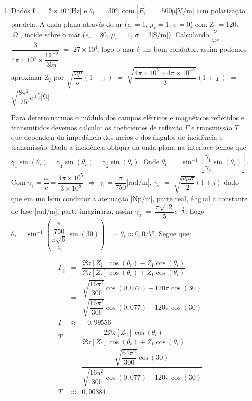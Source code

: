 \begin{enumerate}[1.]
\newpage

\item Dados f $=$ $2 \times 10^{5}$[\si{\hertz}] e $\theta_{i}$ $=$ $30$\si{\degree}, com $|\vec{E}_{i}|$ $=$ $500\si{\micro}$[\si{\volt/\meter}] com polarização paralela. A onda plana através do ar ($\epsilon_{r} = 1$, $\mu_{r} = 1$, $\sigma = 0$) com Z$_{1} = 120\pi$[\si{\ohm}], incide sobre o mar ($\epsilon_{r} = 80$, $\mu_{r} = 1$, $\sigma = 3$[\si{\siemens/\meter}]). Calculando $\dfrac{\sigma}{\omega\epsilon}$ $=$ $\dfrac{3}{4\pi \times 10^{5} \times \dfrac{10^{-9}}{36\pi}}$ $=$ $27 \times 10^{4}$, logo o mar é um bom condutor, assim podemos aproximar Z$_{2}$ por $\sqrt{\dfrac{\omega\mu}{\sigma}}(1 + \jmath)$ $=$ $\sqrt{\dfrac{4\pi \times 10^{5} \times 4\pi \times 10^{-7}}{3}}(1 + \jmath)$ $=$ $\sqrt{\dfrac{8\pi^{2}}{75}}e^{\jmath\frac{\pi}{4}}$[\si{\ohm}] %

Para determinarmos o módulo dos campos elétricos e magnéticos refletidos e transmitidos devemos calcular os coeficientes de reflexão $\Gamma$ e transmissão $T$ que dependem da impedância dos meios e dos ângulos de incidência e transmissão. Dada a incidência oblíqua da onda plana na interface temos que $\gamma_{1}\sin(\theta_i) = \gamma_{1}\sin(\theta_{r}) = \gamma_{2}\sin(\theta_{t})$. Onde $\theta_{t}$ $=$ $\sin^{-1}\left[\dfrac{\gamma_{1}}{\gamma_{2}}\sin(\theta_{i})\right]$. Com $\gamma_{1} = \dfrac{\omega}{c} = \dfrac{4\pi \times 10^{5}}{3 \times 10^{8}}$ $\Rightarrow$ $\gamma_{1} = \dfrac{\pi}{750}$[\si{\radian/\meter}], $\gamma_{2}$ $=$ $\sqrt{\dfrac{\omega\mu\sigma}{2}}(1 + j)$ dado que em um bom condutor a atenuação [\si{\neper/\meter}], parte real, é igual a constante de fase [\si{\radian/\meter}], parte imaginária, assim $\gamma_{2}$ $=$ $\dfrac{\pi\sqrt{12}}{5}e^{\jmath\frac{\pi}{4}}$. Logo $\theta_{t} = \sin^{-1}\left(\dfrac{\dfrac{\pi}{750}}{\dfrac{\pi\sqrt{6}}{5}}\sin(30)\right)$ $\Rightarrow$ $\theta_{t} \approx 0,077$\si{\degree}. Segue que:

\begin{eqnarray*}
\Gamma_{\parallel} & = & \dfrac{\mathfrak{Re}[Z_{2}]\cos(\theta_{t}) - Z_{1}\cos(\theta_{i})}{\mathfrak{Re}[Z_{2}]\cos(\theta_{t}) + Z_{1}\cos(\theta_{i})} \nonumber \\
& = & \dfrac{\sqrt{\dfrac{16\pi^{2}}{300}}\cos(0,077) - 120\pi\cos(30)}{\sqrt{\dfrac{16\pi^{2}}{300}}\cos(0,077) + 120\pi\cos(30)} \nonumber \\
\Gamma & \approx & -0,99556 \nonumber \\
T_{\parallel} & = & \dfrac{2\mathfrak{Re}[Z_{2}]\cos(\theta_{i})}{\mathfrak{Re}[Z_{2}]\cos(\theta_{t}) + Z_{1}\cos(\theta_{i})} \nonumber \\
& = & \dfrac{\sqrt{\dfrac{64\pi^{2}}{300}}\cos(30)}{\sqrt{\dfrac{16\pi^{2}}{300}}\cos(0,077) + 120\pi\cos(30)} \nonumber \\
T_{\parallel} & \approx & 0,00384 \nonumber
\end{eqnarray*}



\end{enumerate}
